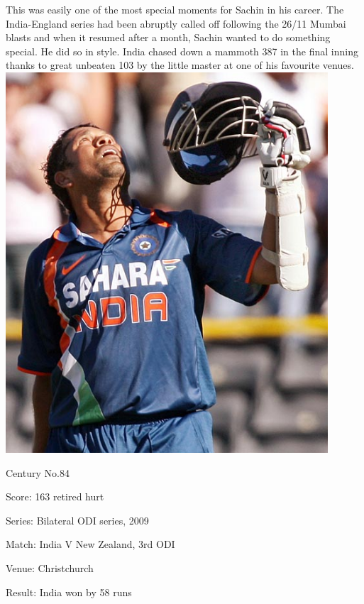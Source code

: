 \documentclass[11pt, a4paper]{article}
\begin{document}
This was easily one of the most special moments for Sachin in his career. The India-England series had been abruptly called off following the 26/11 Mumbai blasts and when it resumed after a month, Sachin wanted to do something special. He did so in style. India chased down a mammoth 387 in the final inning thanks to great unbeaten 103 by the little master at one of his favourite venues. 
\newpage
\includegraphics[width=0.9\textwidth]{pics/84.jpg}

Century No.84 

Score: 163 retired hurt 

Series: Bilateral ODI series, 2009 

Match: India V New Zealand, 3rd ODI 

Venue: Christchurch 

Result: India won by 58 runs 
\end{document}
